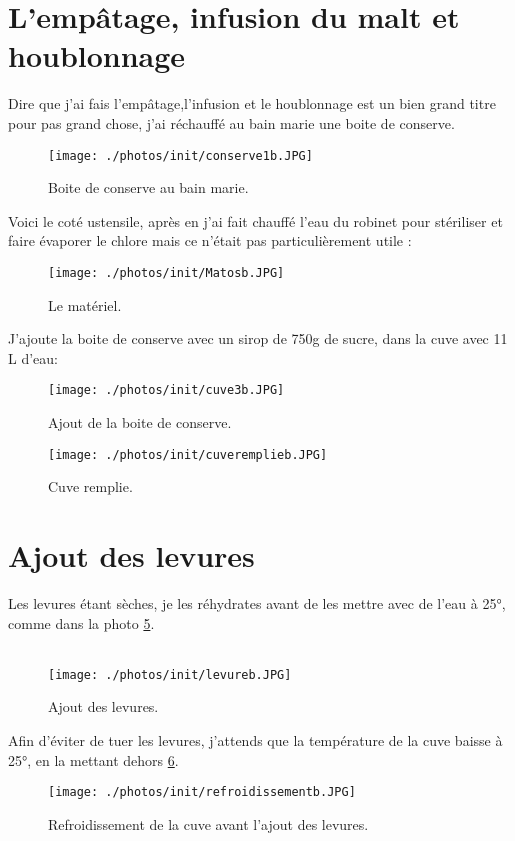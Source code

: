 \documentclass[twoside,twocolumn]{report}
\begin{document}
		\section{L'empâtage, infusion du malt et houblonnage} 
			Dire que j'ai fais l'empâtage,l'infusion et le houblonnage est un bien grand titre pour pas grand chose, j'ai réchauffé au bain marie une boite de conserve. \\
			 \begin{figure}[h!]
			 	\centering
			 	\texttt{[image: ./photos/init/conserve1b.JPG]}
			 	\caption{Boite de conserve au bain marie.}
			 	\label{boite}
			 \end{figure}
			Voici le coté ustensile, après en j'ai fait chauffé l'eau du robinet pour stériliser et faire évaporer le chlore mais ce n'était pas particulièrement utile :
			\begin{figure}[h!]
				\centering
				\texttt{[image: ./photos/init/Matosb.JPG]}
				\caption{Le matériel.}
				\label{matos}
			\end{figure}
			J'ajoute la boite de conserve avec un sirop de 750g de sucre, dans la cuve avec 11 L d'eau:
			\begin{figure}[h!]
				\centering
				\texttt{[image: ./photos/init/cuve3b.JPG]}
				\caption{Ajout de la boite de conserve.}
				\label{cuve}
			\end{figure}
			\begin{figure}[h!]
			\centering
			\texttt{[image: ./photos/init/cuveremplieb.JPG]}
			\caption{Cuve remplie.}
			\label{cuver}
			\end{figure}
			\section{Ajout des levures}
			Les levures étant sèches, je les réhydrates avant de les mettre avec de l'eau à 25°, comme dans la photo \ref{levure}.\\ \\
			\begin{figure}[h!]
				\centering
				\texttt{[image: ./photos/init/levureb.JPG]}
				\caption{Ajout des levures.}
				\label{levure}
			\end{figure}
			Afin d'éviter de tuer les levures, j'attends que la température de la cuve baisse à 25°, en la mettant dehors \ref{refroid}.
			\begin{figure}[h!]
				\centering
				\texttt{[image: ./photos/init/refroidissementb.JPG]}
				\caption{Refroidissement de la cuve avant l'ajout des levures.}
				\label{refroid}
			\end{figure}
		
\end{document}
